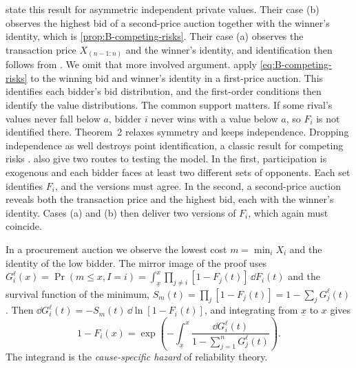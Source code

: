  state this result for asymmetric independent private values. Their case
(b) observes the highest bid of a second-price auction together with the winner's identity, which is
\cref{prop:B-competing-risks}. Their case (a) observes the transaction price $X_{(n-1:n)}$ and the winner's
identity, and identification then follows from \citet{Meilijson1981}. We omit that more involved argument.
\citet[Section~3.3.1, eq.~(3.8)]{AtheyHaile2007} apply \eqref{eq:B-competing-risks} to the winning bid and
winner's identity in a first-price auction. This identifies each bidder's bid distribution, and the
first-order conditions then identify the value distributions. The common support matters. If some rival's
values never fall below $a$, bidder $i$ never wins with a value below $a$, so $F_i$ is not identified there.
Theorem~2 relaxes symmetry and keeps independence. Dropping independence as well destroys point
identification, a classic result for competing risks \citep{Tsiatis1975}. 
also give two routes to testing the model. In the first, participation is exogenous and each bidder faces at
least two different sets of opponents. Each set identifies $F_i$, and the versions must agree. In the second, a
second-price auction reveals both the transaction price and the highest bid, each with the winner's identity.
Cases (a) and (b) then deliver two versions of $F_i$, which again must coincide.

\begin{remark}\label{rem:B-competing-min}
In a procurement auction we observe the lowest cost $m = \min_i X_i$ and the identity of the low bidder. The
mirror image of the proof uses $G_i^\ell(x) = \Pr(m \leq x, I = i) = \int_{\underline x}^{x}\prod_{j \neq
i}[1 - F_j(t)]\,\dd F_i(t)$ and the survival function of the minimum, $S_m(t) = \prod_j[1 - F_j(t)] = 1 -
\sum_jG_j^\ell(t)$. Then $\dd G_i^\ell(t) = -S_m(t)\,\dd\ln[1 - F_i(t)]$, and integrating from $\underline x$
to $x$ gives
\begin{equation*}
  1 - F_i(x) = \exp\left(-\int_{\underline x}^{x}\frac{\dd G_i^\ell(t)}{1 - \sum_{j=1}^{n}G_j^\ell(t)}\right).
\end{equation*}
The integrand is the \emph{cause-specific hazard} of reliability theory.
\end{remark}

